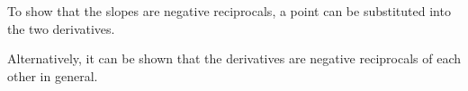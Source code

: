 To show that the slopes are negative reciprocals, a point can be substituted into the two derivatives.

\begin{maplegroup}
\begin{mapleinput}
\end{mapleinput}
\mapleresult
\begin{maplelatex}
\end{maplelatex}
\begin{mapleinput}
\end{mapleinput}
\mapleresult
\begin{maplelatex}
\end{maplelatex}
\end{maplegroup}

Alternatively, it can be shown that the derivatives are negative reciprocals of each other in general.


\begin{maplegroup}
\begin{mapleinput}
\end{mapleinput}
\mapleresult
\begin{maplelatex}
\end{maplelatex}
\end{maplegroup}
